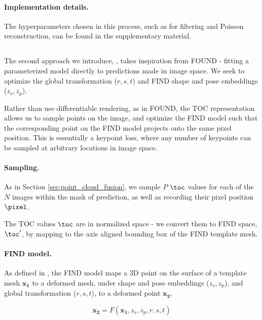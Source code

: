 \paragraph{Implementation details.} The hyperparameters chosen in this process, such as for filtering and Poisson reconstruction, can be found in the supplementary material.

\subsection{\ourOptim}

The second approach we introduce, \ourOptim, takes inspiration from FOUND \cite{boyne2024found} - fitting a parameterized model directly to predictions made in image space.
We seek to optimize the global transformation ($r,s,t$) and FIND shape and pose embeddings ($z_s, z_p$).

Rather than use differentiable rendering, as in FOUND, the TOC representation allows us to sample points on the image, and optimize the FIND model such that the corresponding point on the FIND model projects onto the same pixel position. This is essentially a keypoint loss, where any number of keypoints can be sampled at arbitrary locations in image space.

\def\J{\mathbf{J}}
\def\predpixel{\bm{\hat\pixel}}

\paragraph{Sampling.} As in Section \ref{sec:point_cloud_fusion}, we sample $P$ $\toc$ values for each of the $N$ images within the mask of prediction, as well as recording their pixel position $\pixel$.

The TOC values $\toc$ are in normalized space - we convert them to FIND space, $\toc'$, by mapping to the axis aligned bounding box of the FIND template mesh.

\paragraph{FIND model.} As defined in \cite{boyne2022find}, the FIND model maps a 3D point on the surface of a template mesh $\mathbf{x_1}$ to a deformed mesh, under shape and pose embeddings ($z_s, z_p$), and global transformation  ($r,s,t$), to a deformed point $\mathbf{x_2}$,

\begin{equation}
    \mathbf{x_2} = F(\mathbf{x_1}, z_s, z_p, r, s, t)
\end{equation}


